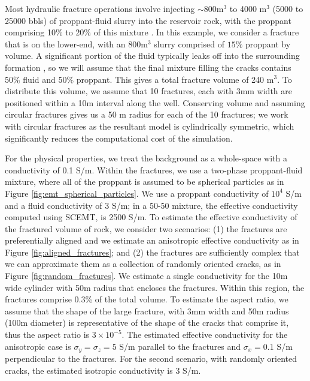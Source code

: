 Most hydraulic fracture operations involve injecting $\sim$800m$^3$ to 4000 m$^3$ (5000 to 25000 bbls) of proppant-fluid slurry into the reservoir rock, with the proppant comprising 10\% to 20\% of this mixture \citep{Hoversten2015}. In this example, we consider a fracture that is on the lower-end, with an 800m$^3$ slurry comprised of $15\%$ proppant by volume. A significant portion of the fluid typically leaks off into the surrounding formation \citep{Novotny1977}, so we will assume that the final mixture filling the cracks contains 50\% fluid and 50\% proppant. This gives a total fracture volume of 240 m$^3$. To distribute this volume, we assume that 10 fractures, each with 3mm width are positioned within a 10m interval along the well. Conserving volume and assuming circular fractures gives us a 50 m radius for each of the 10 fractures; we work with circular fractures as the resultant model is cylindrically symmetric, which significantly reduces the computational cost of the simulation.



For the physical properties, we treat the background as a whole-space with a conductivity of 0.1 S/m. Within the fractures, we use a two-phase proppant-fluid mixture, where all of the proppant is assumed to be spherical particles as in Figure \ref{fig:emt_spherical_particles}. We use a proppant conductivity of $10^4$ S/m and a fluid conductivity of 3 S/m; in a 50-50 mixture, the effective conductivity computed using SCEMT, is 2500 S/m. To estimate the effective conductivity of the fractured volume of rock, we consider two scenarios: (1) the fractures are preferentially aligned and we estimate an anisotropic effective conductivity as in Figure \ref{fig:aligned_fractures}; and (2) the fractures are sufficiently complex that we can approximate them as a collection of randomly oriented cracks, as in Figure \ref{fig:random_fractures}. We estimate a single conductivity for the 10m wide cylinder with 50m radius that encloses the fractures. Within this region, the fractures comprise 0.3\% of the total volume. To estimate the aspect ratio, we assume that the shape of the large fracture, with 3mm width and 50m radius (100m diameter) is representative of the shape of the cracks that comprise it, thus the aspect ratio is $3\times10^{-5}$. The estimated effective conductivity for the anisotropic case is $\sigma_y = \sigma_z = 5$ S/m parallel to the fractures and $\sigma_x = 0.1$ S/m perpendicular to the fractures. For the second scenario, with randomly oriented cracks, the estimated isotropic conductivity is 3 S/m.

